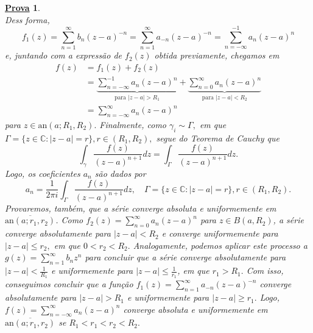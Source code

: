 \documentclass{article}
\newtheorem*{proof*}{\underline{Prova}}
\begin{document}
\begin{proof*}
\[    \]
    Dess forma,
    \[
      f_{1}(z) = \sum\limits_{n=1}^{\infty}b_{n}(z-a)^{-n}=\sum\limits_{n=1}^{\infty}a_{-n}(z-a)^{-n}=\sum\limits_{n=-\infty}^{-1}a_{n}(z-a)^{n}
    \]
    e, juntando com a expressão de \(f_{2}(z)\) obtida previamente, chegamos em 
    \begin{align*}
      f(z)&= f_{1}(z) + f_{2}(z)\\
          &= \underbrace{\sum\limits_{n=-\infty}^{-1}a_{n}(z-a)^{n}}_{\text{para }|z-a|>R_{1}} + \underbrace{\sum\limits_{n=0}^{\infty}a_{n}(z-a)^{n}}_{\text{para }|z-a| < R_{2}}\\
          &= \sum\limits_{n=-\infty}^{\infty}a_{n}(z-a)^{n}
    \end{align*}
    para \(z\in \mathrm{an}(a; R_{1}, R_{2}).\) Finalmente, como \(\gamma_{i}\sim\Gamma ,\) em que \(\Gamma =\{z\in \mathbb{C}:|z-a| = r\}, r\in (R_{1}, R_{2}),\) segue
    do Teorema de Cauchy que 
    \[
      \int_{\gamma }^{}\frac{f(z)}{(z-a)^{n+1}}dz = \int_{\Gamma }^{}\frac{f(z)}{(z-a)^{n+1}}dz.
    \]
    Logo, os coeficientes \(a_{n}\) são dados por 
    \[
      a_{n} = \frac{1}{2\pi i}\int_{\Gamma }^{}\frac{f(z)}{(z-a)^{n+1}}dz,\quad \Gamma = \{z\in \mathbb{C}:|z-a|=r\},r\in(R_{1},R_{2}).
    \]
    Provaremos, também, que a série converge absoluta e uniformemente em \(\overline{\mathrm{an}(a; r_{1}, r_{2})}\). Como \(f_2(z) = \sum\limits_{n=0}^{\infty}a_{n}(z-a)^{n}\) para \(z\in B(a, R_{2})\),
    a série converge absolutamente para \(|z-a| < R_{2}\) e converge uniformemente para \(|z-a|\leq r_{2},\) em que \(0 < r_{2} < R_{2}.\)
    Analogamente, podemos aplicar este processo a \(g(z) = \sum\limits_{n=1}^{\infty}b_{n}z^{n}\) para concluir que a série converge absolutamente para
    \(|z-a| < \frac{1}{R_{1}}\) e uniformemente para \(|z-a|\leq \frac{1}{r_{1}}\), em que \(r_{1} > R_{1}.\) Com isso, conseguimos concluir que a função
    \(f_{1}(z) = \sum\limits_{n=1}^{\infty}a_{-n}(z-a)^{-n}\) converge absolutamente para \(|z-a| > R_{1}\) e uniformemente para \(|z-a| \geq r_{1}.\) Logo,
    \(f(z) = \sum\limits_{n=-\infty}^{\infty}a_{n}(z-a)^{n}\) converge absoluta e uniformemente em \(\overline{\mathrm{an}(a; r_{1}, r_{2})}\) se \(R_{1} < r_{1} < r_{2} < R_{2}.\)


\end{proof*}
\end{document}

